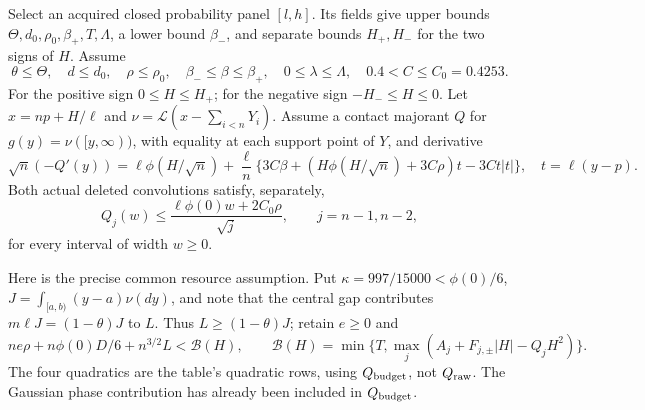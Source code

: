 Select an acquired closed probability panel $[l,h]$.
Its fields give upper bounds $\Theta,d_0,\rho_0,\beta_+,T,\Lambda$,
a lower bound $\beta_-$, and separate bounds $H_+,H_-$ for the two signs of
$H$. Assume
\[
 \theta\le\Theta,\quad d\le d_0,\quad \rho\le\rho_0,
 \quad \beta_-\le\beta\le\beta_+,\quad 0\le\lambda\le\Lambda,
 \quad 0.4<C\le C_0=0.4253.
\]
For the positive sign $0\le H\le H_+$; for the negative sign
$-H_-\le H\le0$. Let $x=np+H/\ell$ and
$\nu=\mathcal L(x-\sum_{i<n}Y_i)$. Assume a contact majorant $Q$ for
$g(y)=\nu([y,\infty))$, with equality at each support point of $Y$,
and derivative
\begin{equation}\label{ms:fourier:cut49:conf:derivative}
 \sqrt n(-Q'(y))=\ell\phi(H/\sqrt n)
 +\frac\ell n\{3C\beta+(H\phi(H/\sqrt n)+3C\rho)t-3Ct|t|\},
 \quad t=\ell(y-p).
\end{equation}
Both actual deleted convolutions satisfy, separately,
\begin{equation}\label{ms:fourier:cut49:conf:concentration}
 Q_j(w)\le\frac{\ell\phi(0)w+2C_0\rho}{\sqrt j},
 \qquad j=n-1,n-2,
\end{equation}
for every interval of width $w\ge0$.

Here is the precise common resource assumption. Put
$\kappa=997/15000<\phi(0)/6$, $J=\int_{[a,b)}(y-a)\nu(dy)$,
and note that the central gap contributes $m\ell J=(1-\theta)J$ to $L$.
Thus $L\ge(1-\theta)J$; retain $e\ge0$ and
\begin{equation}\label{ms:fourier:cut49:conf:budget}
 n e\rho+n\phi(0)D/6+n^{3/2}L<\mathcal B(H),\qquad
 \mathcal B(H)=\min\{T,\max_j(A_j+F_{j,\pm}|H|-Q_jH^2)\}.
\end{equation}
The four quadratics are the table's quadratic rows, using
$Q_{\rm budget}$, not $Q_{\rm raw}$. The Gaussian phase contribution
has already been included in $Q_{\rm budget}$.

